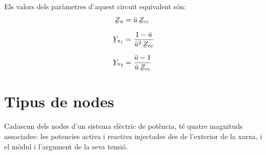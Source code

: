 Els valors dels par\`{a}metres d'aquest circuit equivalent s\'{o}n:
\begin{align}
   \cmplx{Z}_\pi &= \ddot{u} \, \cmplx{Z}\ped{cc} \\[1.5ex]
   \cmplx{Y}_{\pi_1} &= \frac{1-\ddot{u}}{\ddot{u}^2 \,\cmplx{Z}\ped{cc}} \\[1.5ex]
   \cmplx{Y}_{\pi_2} &= \frac{\ddot{u}-1}{\ddot{u}\, \cmplx{Z}\ped{cc}}
\end{align}

\section{Tipus de nodes} 

Cadascun dels nodes d'un sistema el\`{e}ctric de pot\`{e}ncia, t\'{e} quatre
magnituds associades: les potencies activa i reactiva injectades des
de l'exterior de la xarxa, i el m\`{o}dul i l'argument de la seva
tensi\'{o}.

